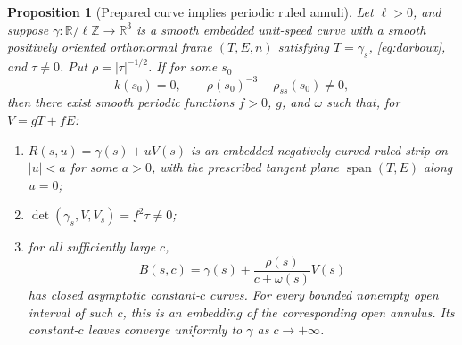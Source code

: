 \documentclass[11pt]{amsart}
\newtheorem{proposition}[theorem]{Proposition}
\theoremstyle{definition}
\newcommand{\R}{\mathbb R}
\begin{document}
\begin{proposition}[Prepared curve implies periodic ruled annuli]
\label{prop:ruled}
Let $\ell>0$, and suppose $\gamma:\R/\ell\mathbb Z\to\R^3$ is a smooth embedded
unit-speed curve with a smooth positively oriented orthonormal frame
$(T,E,n)$ satisfying $T=\gamma_s$, \eqref{eq:darboux}, and
$\tau\ne0$. Put $\rho=|\tau|^{-1/2}$.
If for some $s_0$
\[
 k(s_0)=0,\qquad
 \rho(s_0)^{-3}-\rho_{ss}(s_0)\ne0,
\]
then there exist smooth periodic functions $f>0$, $g$, and $\omega$
such that, for $V=gT+fE$:
\begin{enumerate}
 \item $R(s,u)=\gamma(s)+uV(s)$ is an embedded negatively curved
 ruled strip on $|u|<a$ for some $a>0$, with the prescribed tangent
 plane $\operatorname{span}(T,E)$ along $u=0$;
 \item $\det(\gamma_s,V,V_s)=f^2\tau\ne0$;
 \item for all sufficiently large $c$,
 \[
 B(s,c)=\gamma(s)+\frac{\rho(s)}{c+\omega(s)}V(s)
 \]
 has closed asymptotic constant-$c$ curves.
 For every bounded nonempty open interval of such $c$, this is an embedding of
 the corresponding open annulus. Its constant-$c$ leaves
  converge uniformly to $\gamma$ as $c\to+\infty$.
\end{enumerate}
\end{proposition}
\end{document}
